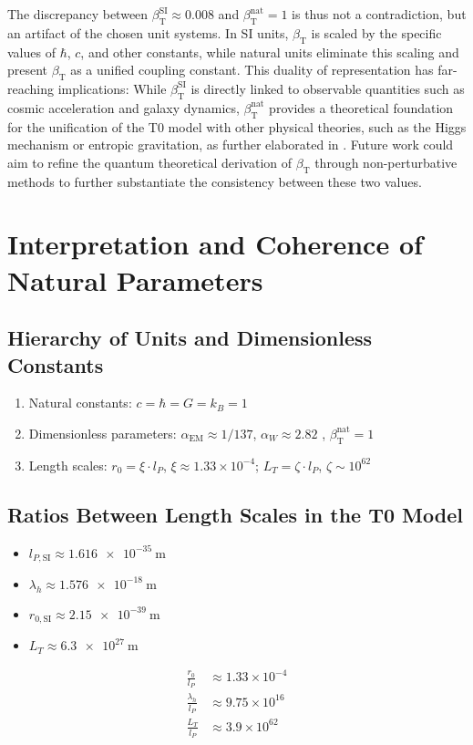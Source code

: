 \documentclass[12pt,a4paper]{article}
\newcommand{\alphaEM}{\alpha_{\text{EM}}}
\newcommand{\betaT}{\beta_{\text{T}}}
\begin{document}
	The discrepancy between \(\betaT^{\text{SI}} \approx 0.008\) and \(\betaT^{\text{nat}} = 1\) is thus not a contradiction, but an artifact of the chosen unit systems. In SI units, \(\betaT\) is scaled by the specific values of \(\hbar\), \(c\), and other constants, while natural units eliminate this scaling and present \(\betaT\) as a unified coupling constant. This duality of representation has far-reaching implications: While \(\betaT^{\text{SI}}\) is directly linked to observable quantities such as cosmic acceleration and galaxy dynamics, \(\betaT^{\text{nat}}\) provides a theoretical foundation for the unification of the T0 model with other physical theories, such as the Higgs mechanism or entropic gravitation, as further elaborated in \cite{pascher_emergente_gravitation_2025}. Future work could aim to refine the quantum theoretical derivation of \(\betaT\) through non-perturbative methods to further substantiate the consistency between these two values.
	
	\section{Interpretation and Coherence of Natural Parameters}
	
	\subsection{Hierarchy of Units and Dimensionless Constants}
	
	\begin{enumerate}
		\item Natural constants: \(c = \hbar = G = k_B = 1\)
		\item Dimensionless parameters: \(\alphaEM \approx 1/137\), \(\alpha_W \approx 2.82\) \cite{pascher_temp_2025}, \(\betaT^{\text{nat}} = 1\)
		\item Length scales: \(r_0 = \xi \cdot l_P\), \(\xi \approx 1.33 \times 10^{-4}\); \(L_T = \zeta \cdot l_P\), \(\zeta \sim 10^{62}\)
	\end{enumerate}
	
	\subsection{Ratios Between Length Scales in the T0 Model}
	
	\begin{itemize}
		\item \(l_{P,\text{SI}} \approx \SI{1.616e-35}{\meter}\)
		\item \(\lambda_h \approx \SI{1.576e-18}{\meter}\)
		\item \(r_{0,\text{SI}} \approx \SI{2.15e-39}{\meter}\)
		\item \(L_T \approx \SI{6.3e27}{\meter}\)
	\end{itemize}
	\begin{align}
		\frac{r_0}{l_P} &\approx 1.33 \times 10^{-4} \\
		\frac{\lambda_h}{l_P} &\approx 9.75 \times 10^{16} \\
		\frac{L_T}{l_P} &\approx 3.9 \times 10^{62}
	\end{align}
	
\end{document}
